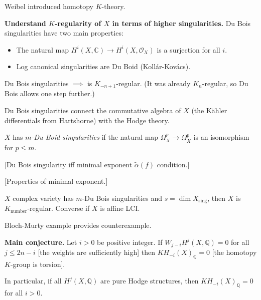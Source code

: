 \medskip\noindent
Weibel introduced homotopy $K$-theory.

\medskip\noindent
{\bf Understand $K$-regularity of $X$
in terms of higher singularities.}
Du Bois singularities have two main
properties:

\begin{itemize}
\item The natural map $H^i(X,\mathbb{C}) \to
H^i(X,\mathcal{O}_X)$ is a surjection for
all $i$.

\item Log canonical singularities are Du
Boid (Kollár-Kovács).
\end{itemize}

\noindent
Du Bois singularities $\implies$
is $K_{-n+1}$-regular. (It was already
$K_n$-regular, so Du Bois allows one step
further.)

Du Bois singularities connect the
commutative algebra of $X$ (the Kähler
differentials from Hartshorne)
with the Hodge theory.

\begin{definition}
\label{definition-du-bois}
$X$ has {\it $m$-Du Boid singularities} 
if the natural map $\Omega_X^p \to
\underline{\Omega}_X^p$ is an isomorphism
for $p \leq m$.
\end{definition}

\begin{theorem}
\label{theorem-mopwjksy}
[Du Bois singularity iff minimal exponent
$\tilde{\alpha}(f)$ condition.]
\end{theorem}

[Properties of minimal exponent.]

\begin{theorem}[Shen 25]
\label{theorem-shen25}
$X$ complex variety has $m$-Du Bois
singularities and $s=\dim
X_{\operatorname{sing}}$, then $X$ is
$K_{\operatorname{number}}$-regular.
Converse if $X$ is affine LCI.
\end{theorem}

\noindent
Bloch-Murty example provides counterexample.

\medskip\noindent
{\bf Main conjecture.}
Let $i >0 $ be positive integer. If
$W_{j-i}H^j(X,\mathbb{Q})=0$ for all
$j \leq  2n-i$ [the weights are sufficiently
high] then $KH_{-i}(X)_{\mathbb{Q}}=0$
[the homotopy $K$-group is torsion].

In particular, if all $H^j(X,\mathbb{Q})$
are pure Hodge structures, then
$KH_{-i}(X)_{\mathbb{Q}}=0$ for all $i>0$.

